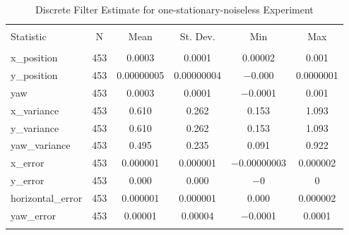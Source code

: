 
\begin{table}[h] \centering 
  \caption{Discrete Filter Estimate for one-stationary-noiseless Experiment} 
  \label{tab:one_stationary_noiseless_discrete_summary} 
\begin{tabular}{@{\extracolsep{5pt}}lccccc} 
\\[-1.8ex]\hline 
\hline \\[-1.8ex] 
Statistic & \multicolumn{1}{c}{N} & \multicolumn{1}{c}{Mean} & \multicolumn{1}{c}{St. Dev.} & \multicolumn{1}{c}{Min} & \multicolumn{1}{c}{Max} \\ 
\hline \\[-1.8ex] 
x\_position & 453 & \num{0.0003} & \num{0.0001} & \num{0.00002} & \num{0.001} \\ 
y\_position & 453 & \num{0.00000005} & \num{0.00000004} & $-$0.000 & \num{0.0000001} \\ 
yaw & 453 & \num{0.0003} & \num{0.0001} & $-$0.0001 & \num{0.001} \\ 
x\_variance & 453 & \num{0.610} & \num{0.262} & \num{0.153} & \num{1.093} \\ 
y\_variance & 453 & \num{0.610} & \num{0.262} & \num{0.153} & \num{1.093} \\ 
yaw\_variance & 453 & \num{0.495} & \num{0.235} & \num{0.091} & \num{0.922} \\ 
x\_error & 453 & \num{0.000001} & \num{0.000001} & $-$0.00000003 & \num{0.000002} \\ 
y\_error & 453 & \num{0.000} & \num{0.000} & $-$0 & 0 \\ 
horizontal\_error & 453 & \num{0.000001} & \num{0.000001} & \num{0.000} & \num{0.000002} \\ 
yaw\_error & 453 & \num{0.00001} & \num{0.00004} & $-$0.0001 & \num{0.0001} \\ 
\hline \\[-1.8ex] 
\end{tabular} 
\end{table} 
